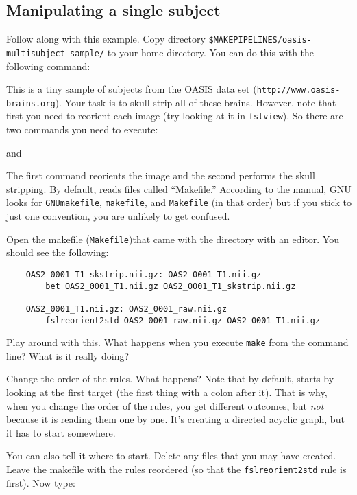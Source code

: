\subsection{Manipulating a single subject}

Follow along with this example. Copy directory 
\newline\texttt{\$MAKEPIPELINES/oasis-multisubject-sample/} 
to your home directory. You can do this with the following command:

This is a tiny sample of subjects from the OASIS data set (\texttt{http://www.oasis-brains.org}). Your task is to skull strip all of these brains. However, note that first you need to reorient each image (try looking at it in \texttt{fslview}). So there are two commands you need to execute:

and

The first command reorients the image and the second performs the skull stripping. By default, \maken{} reads files called ``Makefile.'' According to the manual, GNU looks for \texttt{GNUmakefile}, \texttt{makefile}, and \texttt{Makefile}  (in that order) but if you stick to just one convention, you are unlikely to get confused. 

Open the makefile (\texttt{Makefile})that came with the directory with an editor. You should see the following:

\begin{lstlisting}
	OAS2_0001_T1_skstrip.nii.gz: OAS2_0001_T1.nii.gz
		bet OAS2_0001_T1.nii.gz OAS2_0001_T1_skstrip.nii.gz
		
	OAS2_0001_T1.nii.gz: OAS2_0001_raw.nii.gz
		fslreorient2std OAS2_0001_raw.nii.gz OAS2_0001_T1.nii.gz
\end{lstlisting}

Play around with this. What happens when you execute \texttt{make} from the command line? What is it really doing?

Change the order of the rules. What happens? Note that by default, \maken{} starts by looking at the first target (the first thing with a colon after it). That is why, when you change the order of the rules, you get different outcomes, but \emph{not} because it is reading them one by one. It's creating a directed acyclic graph, but it has to start somewhere.

You can also tell it where to start. Delete any files that you may have created. Leave the makefile with the rules reordered (so that the \texttt{fslreorient2std} rule is first). Now type:

